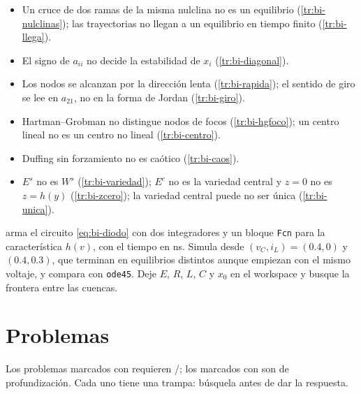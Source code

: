\begin{trampa}[title={\faBug\hspace{0.45em}Las trampas del capítulo, en una caja}]{}
\begin{itemize}
  \item Un cruce de dos ramas de la misma nulclina no es un equilibrio (\cref{tr:bi-nulclinas}); las trayectorias no llegan a un equilibrio en tiempo finito (\cref{tr:bi-llega}).
  \item El signo de $a_{ii}$ no decide la estabilidad de $x_i$ (\cref{tr:bi-diagonal}).
  \item Los nodos se alcanzan por la dirección lenta (\cref{tr:bi-rapida}); el sentido de giro se lee en $a_{21}$, no en la forma de Jordan (\cref{tr:bi-giro}).
  \item Hartman--Grobman no distingue nodos de focos (\cref{tr:bi-hgfoco}); un centro lineal no es un centro no lineal (\cref{tr:bi-centro}).
  \item Duffing sin forzamiento no es caótico (\cref{tr:bi-caos}).
  \item $E^s$ no es $W^s$ (\cref{tr:bi-variedad}); $E^c$ no es la variedad central y $z=0$ no es $z=h(y)$ (\cref{tr:bi-zcero}); la variedad central puede no ser única (\cref{tr:bi-unica}).
\end{itemize}
\end{trampa}

\begin{modelo}
 arma el circuito \eqref{eq:bi-diodo} con dos integradores y un bloque \texttt{Fcn} para la característica $h(v)$, con el tiempo en ns. Simula desde $(v_C,i_L)=(0.4,0)$ y $(0.4,0.3)$, que terminan en equilibrios distintos aunque empiezan con el mismo voltaje, y compara con \texttt{ode45}. Deje $E$, $R$, $L$, $C$ y $x_0$ en el workspace y busque la frontera entre las cuencas.
\end{modelo}

\section{Problemas}
\label{sec:bi-problemas}

Los problemas marcados con \etiquetaM{} requieren \matlab/\simulink; los marcados con \etiquetaEstrella{} son de profundización. Cada uno tiene una trampa: búsquela antes de dar la respuesta.

